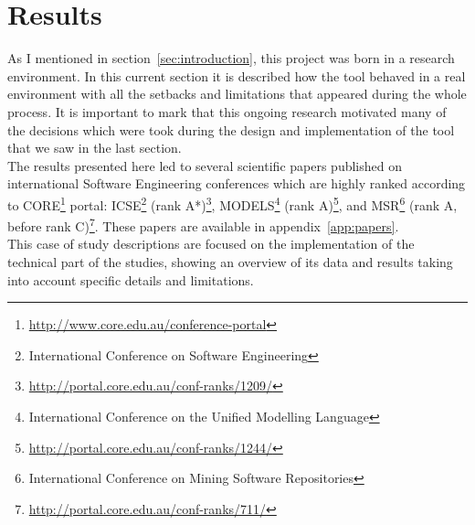 \documentclass[a4paper, 12pt]{book}
\begin{document}
\chapter{Results}
\label{sec:results}
As I mentioned in section~\ref{sec:introduction}, this project was born in a research environment.
In this current section it is described how the tool behaved in a real environment with all the setbacks
and limitations that appeared during the whole process. It is important to mark that this ongoing research
motivated many of the decisions which were took during the design and implementation
of the tool that we saw in the last section.\\
The results presented here led to several scientific papers published on international Software Engineering
conferences which are highly ranked according to CORE\footnote{\url{http://www.core.edu.au/conference-portal}} portal:
ICSE\footnote{International Conference on Software Engineering} (rank A*)\footnote{\url{http://portal.core.edu.au/conf-ranks/1209/}},
MODELS\footnote{International Conference on the Unified Modelling Language} (rank A)\footnote{\url{http://portal.core.edu.au/conf-ranks/1244/}},
and MSR\footnote{International Conference on Mining Software Repositories} (rank A, before rank C)\footnote{\url{http://portal.core.edu.au/conf-ranks/711/}}.
These papers are available in appendix~\ref{app:papers}.
\\This case of study descriptions are focused on the implementation of the technical part of the studies,
showing an overview of its data and results taking into account specific details and limitations.
\end{document}
